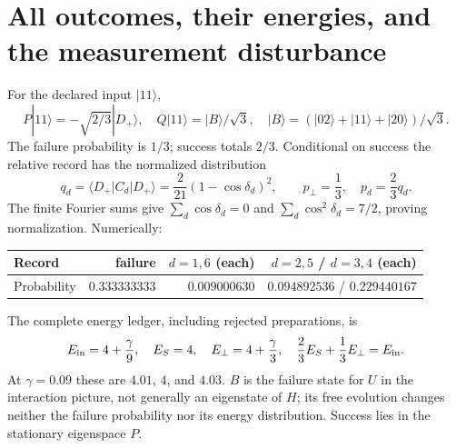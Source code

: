 \documentclass[11pt,a4paper]{article}
\newcommand{\ket}[1]{|#1\rangle}
\newcommand{\bra}[1]{\langle#1|}
\begin{document}
\newpage
\section{All outcomes, their energies, and the measurement disturbance}
For the declared input $\ket{11}$,
\begin{equation}
 P\ket{11}=-\sqrt{2/3}\ket{D_+},\quad
 Q\ket{11}=\ket B/\sqrt3,\quad
 \ket B=(\ket{02}+\ket{11}+\ket{20})/\sqrt3.
\end{equation}
The failure probability is $1/3$; success totals $2/3$. Conditional on
success the relative record has the normalized distribution
\begin{equation}
 q_d=\bra{D_+}C_d\ket{D_+}
 =\frac{2}{21}(1-\cos\delta_d)^2,\qquad
 p_\perp=\frac13,\quad p_d=\frac23q_d.\label{probs}
\end{equation}
The finite Fourier sums give $\sum_d\cos\delta_d=0$ and
$\sum_d\cos^2\delta_d=7/2$, proving normalization. Numerically:
\begin{center}
\begin{tabular}{lrrr}
\toprule
Record & failure & $d=1,6$ (each) & $d=2,5$ / $d=3,4$ (each)\\
\midrule
Probability & $0.333333333$ & $0.009000630$ & $0.094892536$ / $0.229440167$\\
\bottomrule
\end{tabular}
\end{center}
The complete energy ledger, including rejected preparations, is
\begin{equation}
 E_{\rm in}=4+\frac\gamma9,\quad E_S=4,\quad
 E_\perp=4+\frac\gamma3,\quad
 \frac23E_S+\frac13E_\perp=E_{\rm in}.\label{ledger}
\end{equation}
At $\gamma=0.09$ these are $4.01$, $4$, and $4.03$. $B$ is the failure
state for $U$ in the interaction picture, not generally an eigenstate
of $H$; its free evolution changes neither the failure probability nor
its energy distribution. Success lies in the stationary eigenspace $P$.
\end{document}
